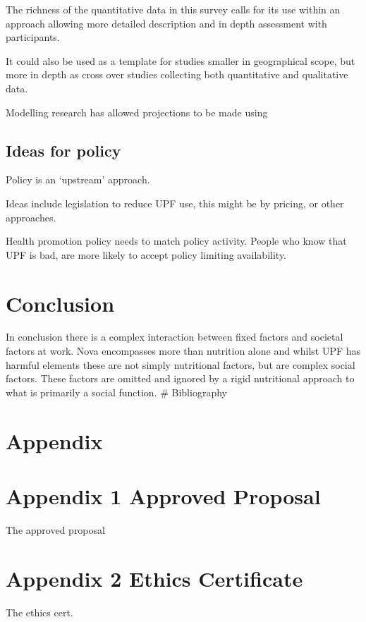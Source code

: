 \documentclass[
]{article}
\newlength{\cslhangindent}
\newlength{\cslentryspacingunit} %
\newenvironment{CSLReferences}[2] %
 {%
  \setlength{\parindent}{0pt}
  \ifodd #1
  \let\oldpar\par
  \def\par{\hangindent=\cslhangindent\oldpar}
  \fi
  \setlength{\parskip}{#2\cslentryspacingunit}
 }%
 {}
\begin{document}
The richness of the quantitative data in this survey calls for its use
within an approach allowing more detailed description and in depth
assessment with participants.

It could also be used as a template for studies smaller in geographical
scope, but more in depth as cross over studies collecting both
quantitative and qualitative data.

Modelling research has allowed projections to be made using

\hypertarget{ideas-for-policy}{%
\subsection{Ideas for policy}\label{ideas-for-policy}}

Policy is an `upstream' approach.

Ideas include legislation to reduce UPF use, this might be by pricing,
or other approaches.

Health promotion policy needs to match policy activity. People who know
that UPF is bad, are more likely to accept policy limiting availability.

\newpage

\hypertarget{conclusion}{%
\section{Conclusion}\label{conclusion}}

In conclusion there is a complex interaction between fixed factors and
societal factors at work. Nova encompasses more than nutrition alone and
whilst UPF has harmful elements these are not simply nutritional
factors, but are complex social factors. These factors are omitted and
ignored by a rigid nutritional approach to what is primarily a social
function. \newpage \# Bibliography

\hypertarget{refs}{}
\begin{CSLReferences}{0}{0}
\end{CSLReferences}

\hypertarget{appendix}{%
\section*{Appendix}\label{appendix}}

\hypertarget{appendix-1-approved-proposal}{%
\section{Appendix 1 Approved
Proposal}\label{appendix-1-approved-proposal}}

The approved proposal

\hypertarget{appendix-2-ethics-certificate}{%
\section{Appendix 2 Ethics
Certificate}\label{appendix-2-ethics-certificate}}

The ethics cert.
\end{document}
